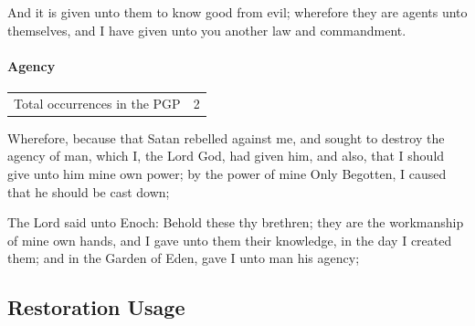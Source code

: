 			\begin{compactdesc}
				\item[{\hyperref[MOSES-6-56]{Moses 6:56}}] And it is given unto them to know good from evil; wherefore they are agents unto themselves, and I have given unto you another law and commandment.
			\end{compactdesc}
			
		\paragraph{Agency}
		
			\begin{tabular}{ll}
				Total occurrences in the PGP & 2
			\end{tabular}
		
			\begin{compactdesc}
				\item[{\hyperref[MOSES-4-3]{Moses 4:3}}] Wherefore, because that Satan rebelled against me, and sought to destroy the agency of man, which I, the Lord God, had given him, and also, that I should give unto him mine own power; by the power of mine Only Begotten, I caused that he should be cast down;
				\item[{\hyperref[MOSES-7-32]{Moses 7:32}}] The Lord said unto Enoch: Behold these thy brethren; they are the workmanship of mine own hands, and I gave unto them their knowledge, in the day I created them; and in the Garden of Eden, gave I unto man his agency;
			\end{compactdesc}
		

	

\subsection{Restoration Usage} %
	\label{AGENCY-RESTORATION}

